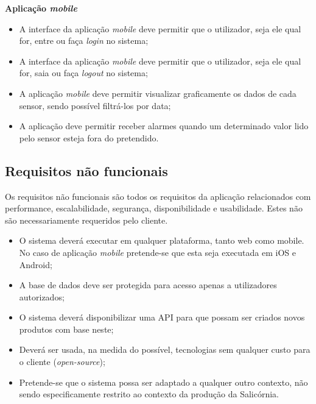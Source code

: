 \textbf{Aplicação \textit{mobile}}



\begin{itemize}
	\item A interface da aplicação \textit{mobile} deve permitir que o utilizador, seja ele qual for, entre ou faça \textit{login} no sistema; 
	
	\item A interface da aplicação \textit{mobile} deve permitir que o utilizador, seja ele qual for, saia ou faça \textit{logout} no sistema;
	
	
	\item A aplicação \textit{mobile} deve permitir visualizar graficamente os dados de cada sensor, sendo possível filtrá-los por data;
	
	\item  A aplicação deve permitir receber alarmes quando um determinado valor lido pelo sensor esteja fora do pretendido.
	
	
\end{itemize}



\subsection{Requisitos não funcionais}


Os requisitos não funcionais são todos os requisitos da aplicação relacionados com performance, escalabilidade, segurança, disponibilidade e usabilidade. Estes não são necessariamente requeridos pelo cliente. 


\begin{itemize}
	\item O sistema deverá executar em qualquer plataforma, tanto web como mobile. No caso de aplicação \textit{mobile} pretende-se que esta seja executada em iOS e Android;  
	
	
	\item A base de dados deve ser protegida para acesso apenas a utilizadores autorizados; 
	
	
	\item O sistema deverá disponibilizar uma \ac{API} para que possam ser criados novos produtos com base neste;  
	
	\item Deverá ser usada, na medida do possível, tecnologias sem qualquer custo para o cliente (\textit{open-source}); 
	
	\item Pretende-se que o sistema possa ser adaptado a qualquer outro contexto, não sendo especificamente restrito ao contexto da produção da Salicórnia.  
	
\end{itemize}



